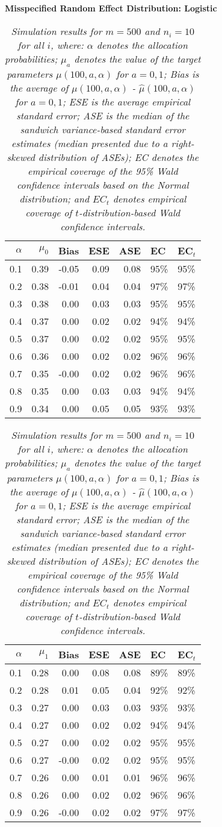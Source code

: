 \documentclass[12pt, letterpaper]{article}
\begin{document}
\begin{center}
\textbf{Misspecified Random Effect Distribution: Logistic} 
\end{center}
\begin{table}[ht!]
\centering
\bgroup
\def\arraystretch{1.25}
\setlength\tabcolsep{0.05in}
\begin{tabular}{rrrrrll}
  \hline
$\alpha$ & $\mu_0$ & Bias & ESE & ASE & EC & EC$_t$ \\ 
  \hline
0.1 & 0.39 & -0.05 & 0.09 & 0.08 & 95\% & 95\% \\ 
  0.2 & 0.38 & -0.01 & 0.04 & 0.04 & 97\% & 97\% \\ 
  0.3 & 0.38 & 0.00 & 0.03 & 0.03 & 95\% & 95\% \\ 
  0.4 & 0.37 & 0.00 & 0.02 & 0.02 & 94\% & 94\% \\ 
  0.5 & 0.37 & 0.00 & 0.02 & 0.02 & 95\% & 95\% \\ 
  0.6 & 0.36 & 0.00 & 0.02 & 0.02 & 96\% & 96\% \\ 
  0.7 & 0.35 & -0.00 & 0.02 & 0.02 & 96\% & 96\% \\ 
  0.8 & 0.35 & 0.00 & 0.03 & 0.03 & 94\% & 94\% \\ 
  0.9 & 0.34 & 0.00 & 0.05 & 0.05 & 93\% & 93\% \\    \hline
\end{tabular}
\egroup
\quad 
\bgroup
\setlength\tabcolsep{0.05in}
\def\arraystretch{1.25}
\begin{tabular}{rrrrrll}
  \hline
$\alpha$ & $\mu_1$ & Bias & ESE & ASE & EC & EC$_t$ \\ 
  \hline
0.1 & 0.28 & 0.00 & 0.08 & 0.08 & 89\% & 89\% \\ 
  0.2 & 0.28 & 0.01 & 0.05 & 0.04 & 92\% & 92\% \\ 
  0.3 & 0.27 & 0.00 & 0.03 & 0.03 & 93\% & 93\% \\ 
  0.4 & 0.27 & 0.00 & 0.02 & 0.02 & 94\% & 94\% \\ 
  0.5 & 0.27 & 0.00 & 0.02 & 0.02 & 95\% & 95\% \\ 
  0.6 & 0.27 & -0.00 & 0.02 & 0.02 & 95\% & 95\% \\ 
  0.7 & 0.26 & 0.00 & 0.01 & 0.01 & 96\% & 96\% \\ 
  0.8 & 0.26 & 0.00 & 0.02 & 0.02 & 96\% & 96\% \\ 
  0.9 & 0.26 & -0.00 & 0.02 & 0.02 & 97\% & 97\% \\ 
   \hline
\end{tabular}
\egroup
\caption*{\textit{Simulation results for $m = 500$ and $n_i = 10$ for all $i$, where: $\alpha$ denotes the allocation probabilities; $\mu_a$ denotes the value of the target parameters $\mu(100, a, \alpha)$ for $a=0,1$; Bias is the average of $\mu(100, a, \alpha)$ - $\hat{\mu}(100, a, \alpha)$ for $a=0, 1$; ESE is the average empirical standard error; ASE is the median of the sandwich variance-based standard error estimates (median presented due to a right-skewed distribution of ASEs); EC denotes the empirical coverage of the 95\% Wald confidence intervals based on the Normal distribution; and $EC_t$ denotes empirical coverage of $t$-distribution-based Wald confidence intervals.} \\ 

}
\end{table}
\end{document}
